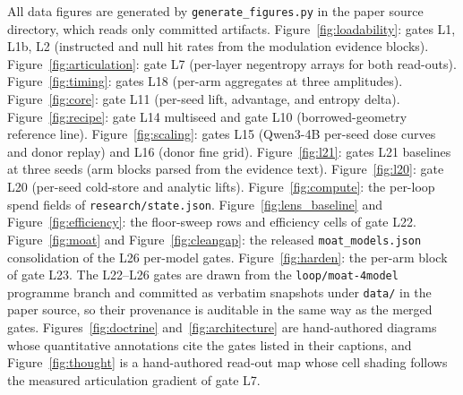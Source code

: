 All data figures are generated by \texttt{generate\_figures.py} in the paper source directory, which reads only committed artifacts. Figure~\ref{fig:loadability}: gates L1, L1b, L2 (instructed and null hit rates from the modulation evidence blocks). Figure~\ref{fig:articulation}: gate L7 (per-layer negentropy arrays for both read-outs). Figure~\ref{fig:timing}: gates L18 (per-arm aggregates at three amplitudes). Figure~\ref{fig:core}: gate L11 (per-seed lift, advantage, and entropy delta). Figure~\ref{fig:recipe}: gate L14 multiseed and gate L10 (borrowed-geometry reference line). Figure~\ref{fig:scaling}: gates L15 (Qwen3-4B per-seed dose curves and donor replay) and L16 (donor fine grid). Figure~\ref{fig:l21}: gates L21 baselines at three seeds (arm blocks parsed from the evidence text). Figure~\ref{fig:l20}: gate L20 (per-seed cold-store and analytic lifts). Figure~\ref{fig:compute}: the per-loop spend fields of \texttt{research/state.json}. Figure~\ref{fig:lens_baseline} and Figure~\ref{fig:efficiency}: the floor-sweep rows and efficiency cells of gate L22. Figure~\ref{fig:moat} and Figure~\ref{fig:cleangap}: the released \texttt{moat\_models.json} consolidation of the L26 per-model gates. Figure~\ref{fig:harden}: the per-arm block of gate L23. The L22--L26 gates are drawn from the \texttt{loop/moat-4model} programme branch and committed as verbatim snapshots under \texttt{data/} in the paper source, so their provenance is auditable in the same way as the merged gates. Figures~\ref{fig:doctrine} and~\ref{fig:architecture} are hand-authored diagrams whose quantitative annotations cite the gates listed in their captions, and Figure~\ref{fig:thought} is a hand-authored read-out map whose cell shading follows the measured articulation gradient of gate L7.

